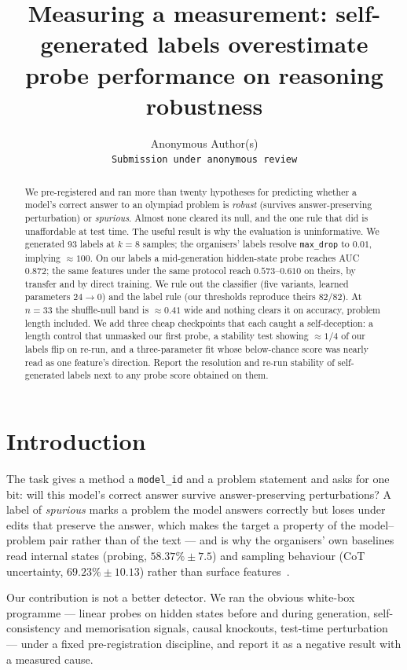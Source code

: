 \documentclass[10pt]{article}
\title{Measuring a measurement: self-generated labels overestimate\\
probe performance on reasoning robustness}
\author{Anonymous Author(s)\\\texttt{Submission under anonymous review}}
\date{}
\begin{document}
\maketitle

\begin{abstract}
We pre-registered and ran more than twenty hypotheses for predicting whether a model's correct
answer to an olympiad problem is \emph{robust} (survives answer-preserving perturbation) or
\emph{spurious}. Almost none cleared its null, and the one rule that did is unaffordable at test
time. The useful result is why the evaluation is uninformative. We generated 93 labels at $k{=}8$
samples; the organisers' labels resolve \texttt{max\_drop} to $0.01$, implying $\approx 100$. On our
labels a mid-generation hidden-state probe reaches AUC $0.872$; the same features under the same
protocol reach $0.573$--$0.610$ on theirs, by transfer and by direct training. We rule out the
classifier (five variants, learned parameters $24 \to 0$) and the label rule (our thresholds
reproduce theirs 82/82). At $n{=}33$ the shuffle-null band is $\approx 0.41$ wide and nothing clears
it on accuracy, problem length included. We add three cheap checkpoints that each caught a
self-deception: a length control that unmasked our first probe, a stability test showing
$\approx 1/4$ of our labels flip on re-run, and a three-parameter fit whose below-chance score was
nearly read as one feature's direction. Report the resolution and re-run stability of
self-generated labels next to any probe score obtained on them.
\end{abstract}

\section{Introduction}
\label{sec:intro}
The task gives a method a \texttt{model\_id} and a problem statement and asks for one bit: will this
model's correct answer survive answer-preserving perturbations? A label of \emph{spurious} marks a
problem the model answers correctly but loses under edits that preserve the answer, which makes the
target a property of the model--problem pair rather than of the text --- and is why the organisers'
own baselines read internal states (probing, $58.37\% \pm 7.5$) and sampling behaviour (CoT
uncertainty, $69.23\% \pm 10.13$) rather than surface features~\cite{aimo2026}.

Our contribution is not a better detector. We ran the obvious white-box programme --- linear probes
on hidden states before and during generation, self-consistency and memorisation signals, causal
knockouts, test-time perturbation --- under a fixed pre-registration discipline, and report it as a
negative result with a measured cause.
\end{document}
